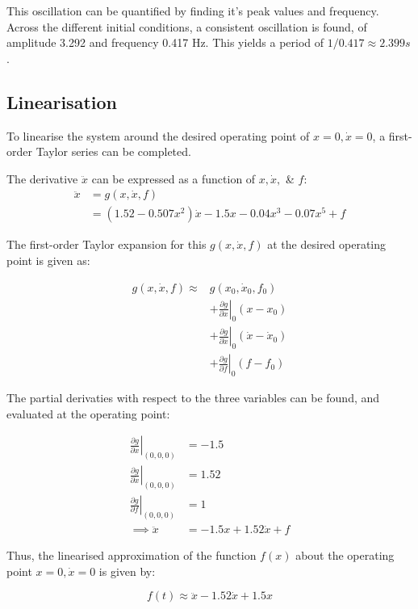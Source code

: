 \documentclass[conference,onecolumn,a4paper,11pt]{IEEEtran}
\begin{document}
This oscillation can be quantified by finding it's peak values and frequency. Across the different initial conditions, a consistent oscillation is found, of amplitude 3.292 and frequency 0.417 Hz. This yields a period of $1/0.417 \approx 2.399s$. 

\subsection{Linearisation}
To linearise the system around the desired operating point of $x = 0, \dot{x} = 0$, a first-order Taylor series can be completed.


The derivative $\ddot{x}$ can be expressed as a function of $x, \dot{x},$ \& $f$:
$$
    \begin{aligned}
    \ddot{x} &= g(x,\dot{x},f)\\
    &=(1.52-0.507x^2)\dot{x}-1.5x-0.04x^3-0.07x^5+f
    \end{aligned}
$$

The first-order Taylor expansion for this $g(x, \dot{x}, f)$ at the desired operating point is given as: 

\begin{align*}
g(x,\dot{x},f)\approx {}&
g(x_0,\dot{x}_0,f_0)\\
&+\left.\frac{\partial g}{\partial x}\right|_0(x-x_0)\\
&+\left.\frac{\partial g}{\partial\dot{x}}\right|_0(\dot{x}-\dot{x}_0)\\
&+\left.\frac{\partial g}{\partial f}\right|_0(f-f_0)
\end{align*}

The partial derivaties with respect to the three variables can be found, and evaluated at the operating point:

\begin{align*}
    \left.\frac{\partial g}{\partial x}\right|_{(0,0,0)} &= -1.5 \\
    \left.\frac{\partial g}{\partial \dot{x}}\right|_{(0,0,0)} &= 1.52 \\
    \left.\frac{\partial g}{\partial f}\right|_{(0,0,0)} &= 1 \\
    \implies \ddot{x} &= -1.5x + 1.52\dot{x} + f
\end{align*}

Thus, the linearised approximation of the function $f(x)$ about the operating point $x = 0, \dot{x} = 0$ is given by:

\begin{equation}
    f(t) \approx \ddot{x} - 1.52\dot{x} + 1.5{x}
    \label{eq:prob2_linear}
\end{equation}
\end{document}
